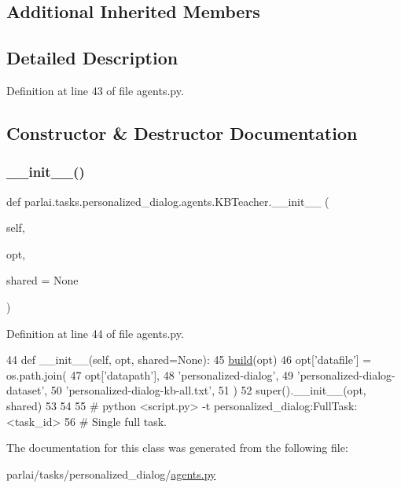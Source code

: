 \subsection*{Additional Inherited Members}


\subsection{Detailed Description}


Definition at line 43 of file agents.\+py.



\subsection{Constructor \& Destructor Documentation}
\mbox{\label{classparlai_1_1tasks_1_1personalized__dialog_1_1agents_1_1KBTeacher_a1e5c4c2117b3fee7d37aa919d961b2f2}} 
\subsubsection{\texorpdfstring{\+\_\+\+\_\+init\+\_\+\+\_\+()}{\_\_init\_\_()}}
{\footnotesize\ttfamily def parlai.\+tasks.\+personalized\+\_\+dialog.\+agents.\+K\+B\+Teacher.\+\_\+\+\_\+init\+\_\+\+\_\+ (\begin{DoxyParamCaption}\item[{}]{self,  }\item[{}]{opt,  }\item[{}]{shared = {\ttfamily None} }\end{DoxyParamCaption})}



Definition at line 44 of file agents.\+py.


\begin{DoxyCode}
44     \textcolor{keyword}{def }\_\_init\_\_(self, opt, shared=None):
45         \hyperlink{namespaceparlai_1_1mturk_1_1tasks_1_1talkthewalk_1_1download_a8c0fbb9b6dfe127cb8c1bd6e7c4e33fd}{build}(opt)
46         opt[\textcolor{stringliteral}{'datafile'}] = os.path.join(
47             opt[\textcolor{stringliteral}{'datapath'}],
48             \textcolor{stringliteral}{'personalized-dialog'},
49             \textcolor{stringliteral}{'personalized-dialog-dataset'},
50             \textcolor{stringliteral}{'personalized-dialog-kb-all.txt'},
51         )
52         super().\_\_init\_\_(opt, shared)
53 
54 
55 \textcolor{comment}{# python <script.py> -t personalized\_dialog:FullTask:<task\_id>}
56 \textcolor{comment}{# Single full task.}
\end{DoxyCode}


The documentation for this class was generated from the following file\+:\begin{DoxyCompactItemize}
\item 
parlai/tasks/personalized\+\_\+dialog/\hyperlink{parlai_2tasks_2personalized__dialog_2agents_8py}{agents.\+py}\end{DoxyCompactItemize}
